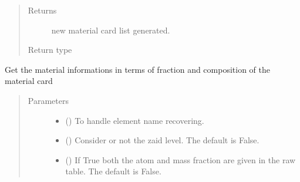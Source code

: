 \documentclass[letterpaper,10pt,english]{sphinxmanual}
\begin{document}
\begin{fulllineitems}
\begin{fulllineitems}
\begin{quote}
\begin{description}
\begin{itemize}
\end{itemize}

\item[{Returns}] \leavevmode
new material card list generated.

\item[{Return type}] \leavevmode
{\hyperref[\detokenize{api/inputgeneration:matreader.MatCardsList}]{}}

\end{description}\end{quote}

\end{fulllineitems}


\begin{fulllineitems}
\label{\detokenize{api/inputgeneration:matreader.MatCardsList.get_info}}
Get the material informations in terms of fraction and composition
of the material card
\begin{quote}\begin{description}
\item[{Parameters}] \leavevmode\begin{itemize}
\item {} 
 ({\hyperref[\detokenize{api/initobjects:libmanager.LibManager}]{}}) \textendash{} To handle element name recovering.

\item {} 
 (\sphinxstyleliteralemphasis{\sphinxupquote{, }}) \textendash{} Consider or not the zaid level. The default is False.

\item {} 
 (\sphinxstyleliteralemphasis{\sphinxupquote{, }}) \textendash{} If True both the atom and mass fraction are given in the raw
table. The default is False.


\end{itemize}
\end{description}
\end{quote}
\end{fulllineitems}
\end{fulllineitems}
\end{document}
